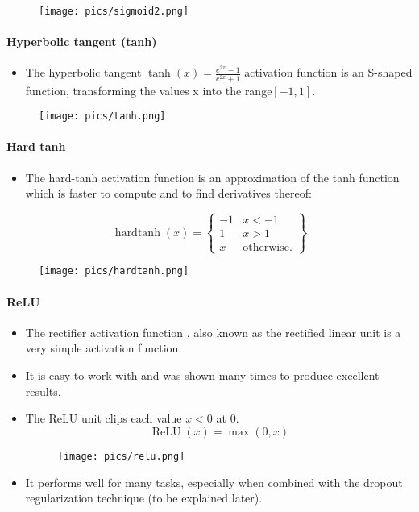 \begin{figure}[htb]
	\centering
	 \texttt{[image: pics/sigmoid2.png]}
\end{figure}



\paragraph{Hyperbolic tangent (tanh)}
\begin{itemize}
\item The hyperbolic tangent $\operatorname{tanh}(x) = \frac{e^{2x}-1}{e^{2x}+1}$ activation function is an S-shaped function, transforming the values x into the range$[-1, 1]$.
\end{itemize}

\begin{figure}[htb]
	\centering
	 \texttt{[image: pics/tanh.png]}
\end{figure}


\paragraph{Hard tanh}
\begin{itemize}
\item The hard-tanh activation function is an approximation of the tanh function which is faster to compute and to find derivatives thereof:
\end{itemize}

  \[
    \operatorname{hardtanh}(x) = \left\{\begin{array}{lr}
        -1 & x < -1\\
        1 & x > 1\\
        x & \text{otherwise.} 
        \end{array} \right\} 
  \]

\begin{figure}[htb]
	\centering
	 \texttt{[image: pics/hardtanh.png]}
\end{figure}

\paragraph{ReLU}
\begin{itemize}
\item The rectifier activation function \cite{glorot2011deep}, also known as the rectified linear unit is a very simple activation function.
\item It is easy to work with and was shown many times to produce excellent results.
\item The ReLU unit clips each value $x < 0$ at $0$.
\begin{displaymath}
 \operatorname{ReLU}(x) = \operatorname{max}(0,x)
\end{displaymath}
\begin{figure}[htb]
	\centering
	 \texttt{[image: pics/relu.png]}
\end{figure}
\item It performs well for many tasks, especially when combined with the dropout regularization technique (to be explained later).
\end{itemize}

